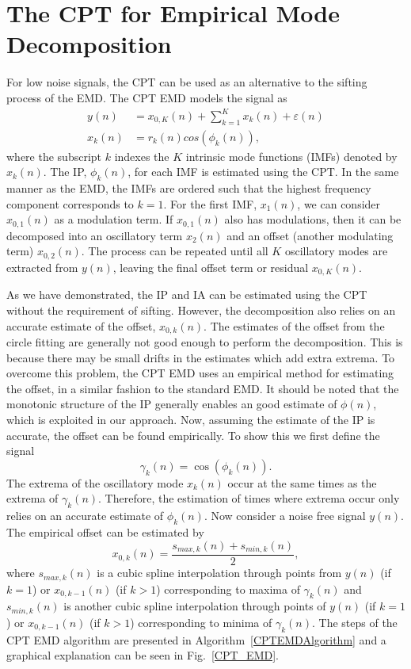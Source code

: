 \documentclass[a4paper]{IEEEtran}
\begin{document}
\section{The CPT for Empirical Mode Decomposition}\label{sect:CPTEMDSection}
For low noise signals, the CPT can be used as an alternative to the sifting process of the EMD. The CPT EMD models the signal as
\begin{align}
    y(n) &= x_{0,K}(n) + \sum_{k=1}^{K}x_k(n) + \varepsilon(n) \\
    x_k\left(n\right) &= r_k\left(n\right)cos\left(\phi_k\left(n\right)\right),
\end{align}
where the subscript $k$ indexes the $K$ intrinsic mode functions (IMFs) denoted by $x_k(n)$. The IP, $\phi_k(n)$, for each IMF is estimated using the CPT. In the same manner as the EMD, the IMFs are ordered such that the highest frequency component corresponds to $k=1$. For the first IMF, $x_1(n)$, we can consider $x_{0,1}(n)$ as a modulation term. If $x_{0,1}(n)$ also has modulations, then it can be decomposed into an oscillatory term $x_2(n)$ and an offset (another modulating term) $x_{0,2}(n)$. The process can be repeated until all $K$ oscillatory modes are extracted from $y(n)$, leaving the final offset term or residual $x_{0,K}(n)$.

As we have demonstrated, the IP and IA can be estimated using the CPT without the requirement of sifting. However, the decomposition also relies on an accurate estimate of the offset, $x_{0,k}(n)$. The estimates of the offset from the circle fitting are generally not good enough to perform the decomposition. This is because there may be small drifts in the estimates which add extra extrema. To overcome this problem, the CPT EMD uses an empirical method for estimating the offset, in a similar fashion to the standard EMD. It should be noted that the monotonic structure of the IP generally enables an good estimate of $\phi(n)$, which is exploited in our approach. Now, assuming the estimate of the IP is accurate, the offset can be found empirically. To show this we first define the signal
\begin{equation}
	\gamma_k(n)=\cos(\phi_k(n)).
\end{equation}   
The extrema of the oscillatory mode $x_k(n)$ occur at the same times as the extrema of $\gamma_k(n)$. Therefore, the estimation of times where extrema occur only relies on an accurate estimate of $\phi_k(n)$. Now consider a noise free signal $y(n)$. The empirical offset can be estimated by 
\begin{equation}
    x_{0,k}(n) = \frac{s_{max,k}(n) + s_{min,k}(n)}{2},
\end{equation}
where $s_{max,k}(n)$ is a cubic spline interpolation through points from $y(n)$ (if $k=1$) or $x_{0,k-1}(n)$ (if $k>1$) corresponding to maxima of $\gamma_k(n)$ and $s_{min,k}(n)$ is another cubic spline interpolation through points of $y(n)$ (if $k=1$) or $x_{0,k-1}(n)$ (if $k>1$) corresponding to minima of $\gamma_k(n)$. The steps of the CPT EMD algorithm are presented in Algorithm~\ref{CPTEMDAlgorithm} and a graphical explanation can be seen in Fig.~\ref{CPT_EMD}.
\end{document}
